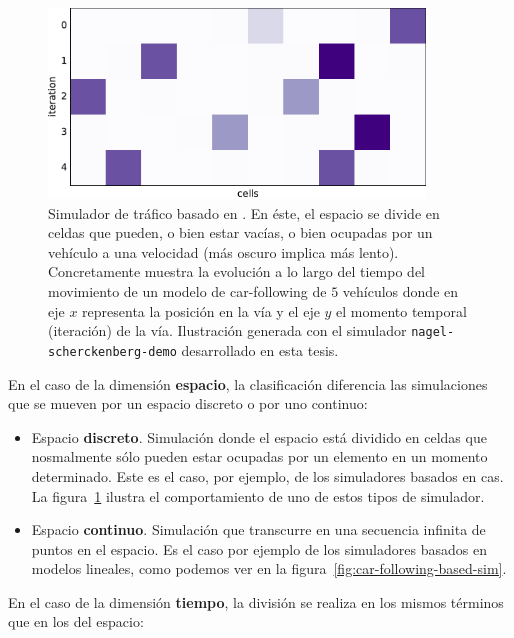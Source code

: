 \begin{figure}
	\centering
	\includegraphics[width=10cm]{images/cellular-automata-based-sim}
	\caption{Simulador de tráfico basado en . En éste, el espacio se divide en celdas que pueden, o bien estar vacías, o bien ocupadas por un vehículo a una velocidad (más oscuro implica más lento). Concretamente muestra la evolución a lo largo del tiempo del movimiento de un modelo de \gls{car-following} de $5$ vehículos donde en eje $x$ representa la posición en la vía y el eje $y$ el momento temporal (iteración) de la vía. Ilustración generada con el simulador \texttt{nagel-scherckenberg-demo} desarrollado en esta tesis.}
	\label{fig:cellular-automata-based-sim}
\end{figure}

En el caso de la dimensión \textbf{espacio}, la clasificación diferencia las simulaciones que se mueven por un espacio discreto o por uno continuo:

\begin{itemize}
	\item Espacio \textbf{discreto}. Simulación donde el espacio está dividido en celdas que nosmalmente sólo pueden estar ocupadas por un elemento en un momento determinado. Este es el caso, por ejemplo, de los simuladores basados en \acp{ca}. La figura~\ref{fig:cellular-automata-based-sim} ilustra el comportamiento de uno de estos tipos de simulador.
	\item Espacio \textbf{continuo}. Simulación que transcurre en una secuencia infinita de puntos en el espacio. Es el caso por ejemplo de los simuladores basados en modelos lineales, como podemos ver en la figura~\ref{fig:car-following-based-sim}.
\end{itemize}

En el caso de la dimensión \textbf{tiempo}, la división se realiza en los mismos términos que en los del espacio:

